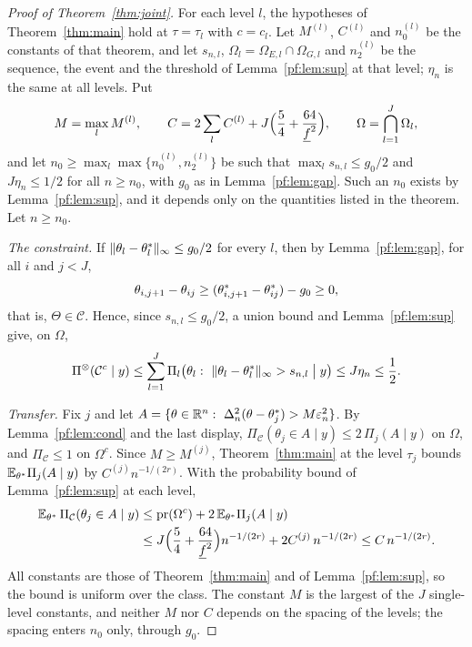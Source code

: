 \begin{proof}[Proof of Theorem~\ref{thm:joint}]
For each level $l$, the hypotheses of Theorem~\ref{thm:main} hold at $\tau=\tau_l$ with $c=c_l$. Let $M^{(l)}$, $C^{(l)}$ and $n_0^{(l)}$ be the constants of that theorem, and let $s_{n,l}$, $\Omega_l=\Omega_{E,l}\cap\Omega_{G,l}$ and $n_2^{(l)}$ be the sequence, the event and the threshold of Lemma~\ref{pf:lem:sup} at that level; $\eta_n$ is the same at all levels. Put
\[
M=\max_{l}M^{(l)},\qquad C=2\sum_{l}C^{(l)}+J\Bigl(\frac54+\frac{64}{\underline f^2}\Bigr),\qquad \Omega=\bigcap_{l=1}^J\Omega_l ,
\]
and let $n_0\ge\max_l\max\{n_0^{(l)},n_2^{(l)}\}$ be such that $\max_ls_{n,l}\le g_0/2$ and $J\eta_n\le1/2$ for all $n\ge n_0$, with $g_0$ as in Lemma~\ref{pf:lem:gap}. Such an $n_0$ exists by Lemma~\ref{pf:lem:sup}, and it depends only on the quantities listed in the theorem. Let $n\ge n_0$.

\emph{The constraint.} If $\|\theta_l-\theta^{*}_l\|_\infty\le g_0/2$ for every $l$, then by Lemma~\ref{pf:lem:gap}, for all $i$ and $j<J$,
\[
\theta_{i,j+1}-\theta_{ij}\ge(\theta^{*}_{i,j+1}-\theta^{*}_{ij})-g_0\ge0 ,
\]
that is, $\Theta\in\mathcal C$. Hence, since $s_{n,l}\le g_0/2$, a union bound and Lemma~\ref{pf:lem:sup} give, on $\Omega$,
\[
\Pi^{\otimes}(\mathcal C^c\mid y)\le\sum_{l=1}^J\Pi_l\bigl(\theta_l:\ \|\theta_l-\thetas_l\|_\infty>s_{n,l}\bigm|y\bigr)\le J\eta_n\le\frac12 .
\]

\emph{Transfer.} Fix $j$ and let $A=\{\theta\in\R^n:\ \Delta_n^2(\theta-\thetas_j)>M\en^2\}$. By Lemma~\ref{pf:lem:cond} and the last display, $\Pi_{\mathcal C}(\theta_j\in A\mid y)\le2\,\Pi_j(A\mid y)$ on $\Omega$, and $\Pi_{\mathcal C}\le1$ on $\Omega^c$. Since $M\ge M^{(j)}$, Theorem~\ref{thm:main} at the level $\tau_j$ bounds $\mathbb{E}_{\theta^{*}}\Pi_j(A\mid y)$ by $C^{(j)}n^{-1/(2r)}$. With the probability bound of Lemma~\ref{pf:lem:sup} at each level,
\[
\begin{aligned}
\mathbb{E}_{\theta^{*}}\,\Pi_{\mathcal C}(\theta_j\in A\mid y)&\le\mathrm{pr}(\Omega^c)+2\,\mathbb{E}_{\theta^{*}}\Pi_j(A\mid y)\\
&\le J\Bigl(\frac54+\frac{64}{\underline f^2}\Bigr)n^{-1/(2r)}+2C^{(j)}\,n^{-1/(2r)}\le C\,n^{-1/(2r)} .
\end{aligned}
\]
All constants are those of Theorem~\ref{thm:main} and of Lemma~\ref{pf:lem:sup}, so the bound is uniform over the class. The constant $M$ is the largest of the $J$ single-level constants, and neither $M$ nor $C$ depends on the spacing of the levels; the spacing enters $n_0$ only, through $g_0$.


\end{proof}
